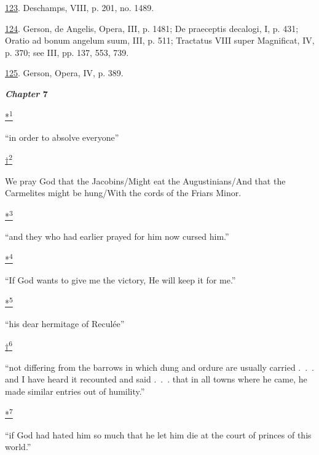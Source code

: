 \protect\hypertarget{23_NOTES.xhtmlux5cux23id_1028}{\protect\hyperlink{13_Chapter_Six__THE_DEPICTION_OF_TH.xhtmlux5cux23id_1027}{123}}.
Deschamps, VIII, p. 201, no. 1489.

\protect\hypertarget{23_NOTES.xhtmlux5cux23id_1026}{\protect\hyperlink{13_Chapter_Six__THE_DEPICTION_OF_TH.xhtmlux5cux23id_1025}{124}}.
Gerson, de Angelis, Opera, III, p. 1481; De praeceptis decalogi, I, p.
431; Oratio ad bonum angelum suum, III, p. 511; Tractatus VIII super
Magnificat, IV, p. 370; see III, pp. 137, 553, 739.

\protect\hypertarget{23_NOTES.xhtmlux5cux23id_1024}{\protect\hyperlink{13_Chapter_Six__THE_DEPICTION_OF_TH.xhtmlux5cux23id_1023}{125}}.
Gerson, Opera, IV, p. 389.

\textbf{\emph{Chapter} 7}

\protect\hypertarget{23_NOTES.xhtmlux5cux23id_3078}{\protect\hyperlink{14_Chapter_Seven__THE_PIOUS_PERSONA.xhtmlux5cux23id_3077}{*\textsuperscript{1}}}
``in order to absolve everyone''

\protect\hypertarget{23_NOTES.xhtmlux5cux23id_3080}{\protect\hyperlink{14_Chapter_Seven__THE_PIOUS_PERSONA.xhtmlux5cux23id_3079}{†\textsuperscript{2}}}
We pray God that the Jacobins/Might eat the Augustinians/And that the
Carmelites might be hung/With the cords of the Friars Minor.

\protect\hypertarget{23_NOTES.xhtmlux5cux23id_2546}{\protect\hyperlink{14_Chapter_Seven__THE_PIOUS_PERSONA.xhtmlux5cux23id_2545}{*\textsuperscript{3}}}
``and they who had earlier prayed for him now cursed him.''

\protect\hypertarget{23_NOTES.xhtmlux5cux23id_2548}{\protect\hyperlink{14_Chapter_Seven__THE_PIOUS_PERSONA.xhtmlux5cux23id_2547}{*\textsuperscript{4}}}
``If God wants to give me the victory, He will keep it for me.''

\protect\hypertarget{23_NOTES.xhtmlux5cux23id_2550}{\protect\hyperlink{14_Chapter_Seven__THE_PIOUS_PERSONA.xhtmlux5cux23id_2549}{*\textsuperscript{5}}}
``his dear hermitage of Reculée''

\protect\hypertarget{23_NOTES.xhtmlux5cux23id_2552}{\protect\hyperlink{14_Chapter_Seven__THE_PIOUS_PERSONA.xhtmlux5cux23id_2551}{†\textsuperscript{6}}}
``not differing from the barrows in which dung and ordure are usually
carried .~.~. and I have heard it recounted and said .~.~. that in all
towns where he came, he made similar entries out of humility.''

\protect\hypertarget{23_NOTES.xhtmlux5cux23id_2554}{\protect\hyperlink{14_Chapter_Seven__THE_PIOUS_PERSONA.xhtmlux5cux23id_2553}{*\textsuperscript{7}}}
``if God had hated him so much that he let him die at the court of
princes of this world.''

